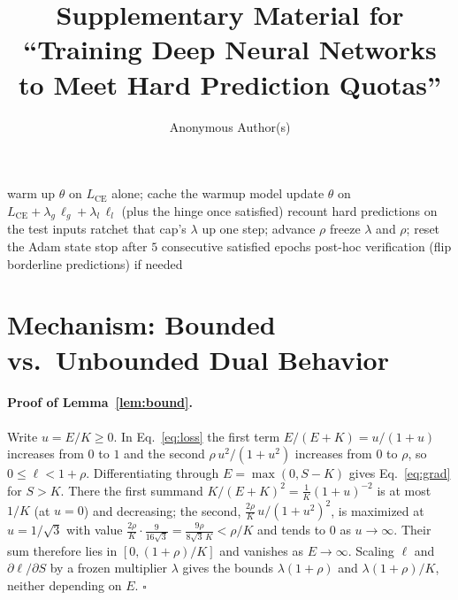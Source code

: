 \documentclass[letterpaper]{article}
\title{Supplementary Material for ``Training Deep Neural Networks to Meet Hard Prediction Quotas''}
\author{Anonymous Author(s)}
\begin{document}
\maketitle

\appendix

\begin{algorithm}[t]
\caption{TraLO training loop (main paper Sec.~3)}
\label{alg:tralo}
\begin{algorithmic}[1]
\STATE warm up $\theta$ on $L_{\text{CE}}$ alone; cache the warmup model
  \STATE update $\theta$ on $L_{\text{CE}} + \lambda_g\,\ell_g + \lambda_l\,\ell_l$ (plus the hinge once satisfied)
  \STATE recount hard predictions on the test inputs
    \STATE ratchet that cap's $\lambda$ up one step; advance $\rho$
    \STATE freeze $\lambda$ and $\rho$; reset the Adam state
  \ENDIF
  \STATE stop after $5$ consecutive satisfied epochs
\ENDFOR
\STATE post-hoc verification (flip borderline predictions) if needed
\end{algorithmic}
\end{algorithm}

\section{Mechanism: Bounded vs.\ Unbounded Dual Behavior}
\label{app:mech}

\paragraph{Proof of Lemma~\ref{lem:bound}.}
Write $u=E/K\ge 0$. In Eq.~\eqref{eq:loss} the first term $E/(E+K)=u/(1+u)$ increases from
$0$ to $1$ and the second $\rho\,u^2/(1+u^2)$ increases from $0$ to $\rho$, so
$0\le\ell<1+\rho$. Differentiating through $E=\max(0,S-K)$ gives Eq.~\eqref{eq:grad} for
$S>K$. There the first summand $K/(E+K)^2=\tfrac1K(1+u)^{-2}$ is at most $1/K$ (at $u{=}0$)
and decreasing; the second, $\tfrac{2\rho}{K}\,u/(1+u^2)^2$, is maximized at $u=1/\sqrt3$ with
value $\tfrac{2\rho}{K}\cdot\tfrac{9}{16\sqrt3}=\tfrac{9\rho}{8\sqrt3\,K}<\rho/K$ and tends to
$0$ as $u\to\infty$. Their sum therefore lies in $[0,(1+\rho)/K]$ and vanishes as
$E\to\infty$. Scaling $\ell$ and $\partial\ell/\partial S$ by a frozen multiplier $\lambda$
gives the bounds $\lambda(1+\rho)$ and $\lambda(1+\rho)/K$, neither depending on $E$.
$\square$
\end{document}
